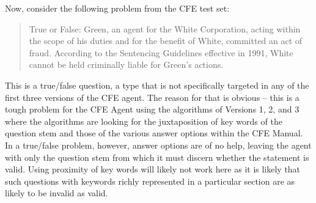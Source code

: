 Now, consider the following problem from the CFE test set:

\blockquote{True or False: Green, an agent for the White Corporation, acting within the scope of his duties and for the benefit of White, committed an act of fraud. According to the Sentencing Guidelines effective in 1991, White cannot be held criminally liable for Green's actions.}

This is a true/false question, a type that is not specifically targeted in any of the first three versions of the CFE agent. The reason for that is obvious – this is a tough problem for the CFE Agent using the algorithms of Versions 1, 2, and 3 where the algorithms are looking for the juxtaposition of key words of the question stem and those of the various answer options within the CFE Manual. In a true/false problem, however, answer options are of no help, leaving the agent with only the question stem from which it must discern whether the statement is valid.  Using proximity of key words will likely not work here as it is likely that such questions with keywords richly represented in a particular section are as likely to be invalid as valid. 

